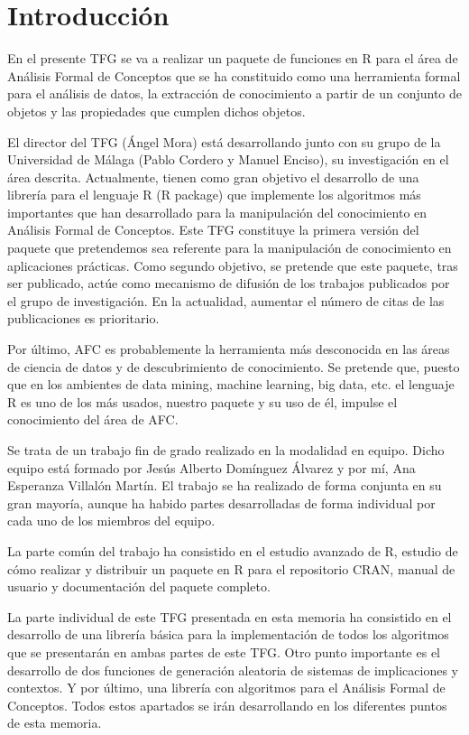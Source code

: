 \section{Introducci\'on}

En el presente TFG se va a realizar un paquete de funciones en 
R para el \'area de An\'alisis Formal de Conceptos que se ha 
constituido como una herramienta formal para el an\'alisis de datos, 
la extracci\'on de conocimiento a partir de un 
conjunto de objetos y las propiedades que cumplen dichos objetos.

El director del TFG (\'Angel Mora) est\'a desarrollando junto 
con su grupo de la Universidad de M\'alaga (Pablo Cordero y Manuel 
Enciso), su investigaci\'on en el \'area descrita. Actualmente, 
tienen como gran objetivo el desarrollo de una librer\'ia para el 
lenguaje R (R package) que implemente los algoritmos m\'as 
importantes que han desarrollado para la manipulaci\'on del 
conocimiento en An\'alisis Formal de Conceptos. Este TFG 
constituye la primera versi\'on del paquete que pretendemos sea 
referente para la manipulaci\'on de conocimiento en aplicaciones 
pr\'acticas. Como segundo objetivo, se pretende que este paquete, tras
ser publicado, act\'ue como mecanismo de difusi\'on de los trabajos 
publicados por el grupo de investigaci\'on. En la actualidad, aumentar el 
n\'umero de citas de las publicaciones es prioritario.

Por \'ultimo, AFC es probablemente la herramienta m\'as desconocida en las \'areas 
de ciencia de datos y de descubrimiento de conocimiento. Se pretende que, puesto que en los 
ambientes de data mining, machine learning, big data, etc. el lenguaje R es uno de los m\'as 
usados, nuestro paquete y su uso de \'el, impulse el conocimiento del \'area de AFC.

Se trata de un trabajo fin de grado realizado en la modalidad en equipo. 
Dicho equipo est\'a formado por Jes\'us Alberto Dom\'inguez \'Alvarez y por m\'i, 
Ana Esperanza Villal\'on Mart\'in. El trabajo se ha realizado de forma conjunta en su 
gran mayor\'ia, aunque ha habido partes desarrolladas de forma individual por cada uno 
de los miembros del equipo.

La parte com\'un del trabajo ha consistido en el estudio avanzado de R, estudio de c\'omo 
realizar y distribuir un paquete en R para el repositorio CRAN, manual de usuario y documentaci\'on del 
paquete completo.

La parte individual de este TFG presentada en esta memoria ha consistido en el desarrollo de una librer\'ia b\'asica 
para la implementaci\'on de todos los algoritmos que se presentar\'an en ambas partes de este TFG. Otro punto importante es 
el desarrollo de dos funciones de generaci\'on aleatoria de sistemas de implicaciones y contextos. Y por \'ultimo, una librer\'ia 
con algoritmos para el An\'alisis Formal de Conceptos. Todos estos apartados se ir\'an desarrollando en los diferentes puntos de esta memoria.
\\
\\

